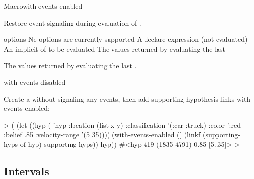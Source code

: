 \documentclass[10pt,twoside,english,pdftex]{article}
\begin{document}
\begin{functiondoc}{Macro}{with-events-enabled}%
  {\code{(}\superstar{}\code{)}
    \superstar{}
    \superstar{}
    \returns{} \superstar}
%
%
  
\fnsyntax

\fnpurpose Restore event signaling during evaluation of .

\fnpackage {}

\fnmodule {}

\fnargs
\begin{args}{options}
\arg[option] No options are currently supported
\arg[declaration] A declare expression (not evaluated)
\arg[forms] An implicit  of  to be evaluated
\arg[results] The values returned by evaluating the last 
\end{args}

\fnreturns The values returned by evaluating the last .

\begin{alsos}{with-events-disabled}
\end{alsos}

\fnexample
{}%
Create a  without signaling any events, then add
supporting-hypothesis links with events enabled:
%
\W\supp
\begin{example}
  > (
       (let ((hyp ( 'hyp 
                     :location (list x y)
                     :classification '(:car :truck)
                     :color ':red
                     :belief .85
                     :velocity-range '(5 35))))
          (with-events-enabled ()
             (linkf (supporting-hyps-of hyp) supporting-hyps))
          hyp))
  #<hyp 419 (1835 4791) 0.85 [5..35]>
  >
\end{example}

\end{functiondoc}


\T\markright{}%
\T\pagestyle{plain}
\T\clearpage
\W{}
\T\pagestyle{fancy}
\T\thispagestyle{fancybottom}
\T\global\def\fnlastname{ }%

\subsection{Intervals}
\label{sec:interval}%
\end{document}

